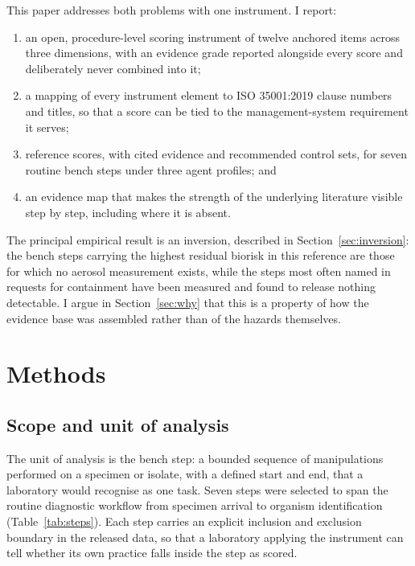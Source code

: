 This paper addresses both problems with one instrument. I report:

\begin{enumerate}[label=(\roman*)]
\item an open, procedure-level scoring instrument of twelve anchored items across three
      dimensions, with an evidence grade reported alongside every score and deliberately
      never combined into it;
\item a mapping of every instrument element to ISO 35001:2019 clause numbers and titles,
      so that a score can be tied to the management-system requirement it serves;
\item reference scores, with cited evidence and recommended control sets, for seven
      routine bench steps under three agent profiles; and
\item an evidence map that makes the strength of the underlying literature visible
      step by step, including where it is absent.
\end{enumerate}

\noindent The principal empirical result is an inversion, described in
Section~\ref{sec:inversion}: the bench steps carrying the highest residual biorisk in this
reference are those for which no aerosol measurement exists, while the steps most often
named in requests for containment have been measured and found to release nothing
detectable. I argue in Section~\ref{sec:why} that this is a property of how the evidence
base was assembled rather than of the hazards themselves.

\section{Methods}

\subsection{Scope and unit of analysis}

The unit of analysis is the bench step: a bounded sequence of manipulations performed on a
specimen or isolate, with a defined start and end, that a laboratory would recognise as
one task. Seven steps were selected to span the routine diagnostic workflow from specimen
arrival to organism identification (Table~\ref{tab:steps}). Each step carries an explicit
inclusion and exclusion boundary in the released data, so that a laboratory applying the
instrument can tell whether its own practice falls inside the step as scored.

